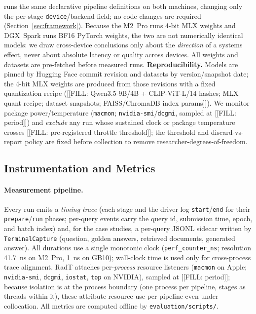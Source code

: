 \sysname{} runs the same declarative pipeline definitions on both
machines, changing only the per-stage \texttt{device}/backend field; no
code changes are required (Section~\ref{sec:framework}). Because the
M2~Pro runs 4-bit MLX weights and DGX~Spark runs BF16 PyTorch weights, the
two are not numerically identical models: we draw cross-device conclusions
only about the \emph{direction} of a systems effect, never about absolute
latency or quality across devices. All weights and datasets are
pre-fetched before measured runs. \textbf{Reproducibility.} Models are
pinned by Hugging Face commit revision and datasets by version/snapshot
date; the 4-bit MLX weights are produced from those revisions with a fixed
quantization recipe ([[FILL: Qwen3.5-9B/4B + CLIP-ViT-L/14 hashes; MLX
quant recipe; dataset snapshots; FAISS/ChromaDB index params]]). We
monitor package power/temperature (\texttt{macmon};
\texttt{nvidia-smi}/\texttt{dcgmi}, sampled at [[FILL: period]]) and
\emph{exclude} any run whose sustained clock or package temperature
crosses [[FILL: pre-registered throttle threshold]]; the threshold and
discard-vs-report policy are fixed before collection to remove
researcher-degrees-of-freedom.

\subsection{Instrumentation and Metrics}
\label{sec:setup-metrics}

\paragraph{Measurement pipeline.} Every run emits a \emph{timing trace}
(each stage and the driver log \texttt{start}/\texttt{end} for their
\texttt{prepare}/\texttt{run} phases; per-query events carry the query id,
submission time, epoch, and batch index) and, for the case studies, a
per-query JSONL sidecar written by \texttt{TerminalCapture} (question,
golden answers, retrieved documents, generated answer). All durations use
a single monotonic clock (\texttt{perf\_counter\_ns};
resolution \SI{41.7}{\nano\second} on M2~Pro, \SI{1}{\nano\second} on
GB10); wall-clock time is used only for cross-process trace alignment.
RadT attaches per-\emph{process} resource listeners (\texttt{macmon} on
Apple; \texttt{nvidia-smi}, \texttt{dcgmi}, \texttt{iostat}, \texttt{top}
on NVIDIA), sampled at [[FILL: period]]; because isolation is at the
process boundary (one process per pipeline, stages as threads within it),
these attribute resource use per pipeline even under collocation. All
metrics are computed offline by \texttt{evaluation/scripts/}.

